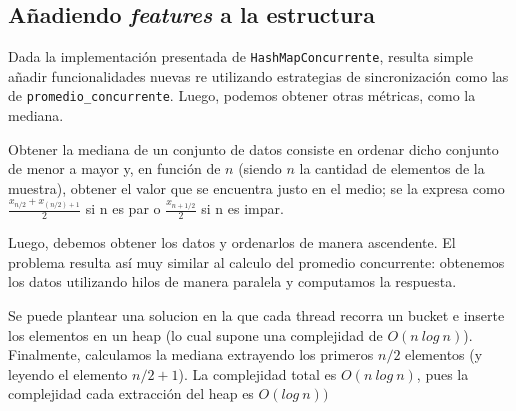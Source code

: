 \documentclass[a4paper]{article}
\begin{document}
    \subsection{Añadiendo \textit{features} a la estructura}

    Dada la implementación presentada de \texttt{HashMapConcurrente}, resulta simple añadir funcionalidades nuevas re utilizando estrategias de sincronización como las de \texttt{promedio\_concurrente}. Luego, podemos obtener otras métricas, como la mediana.

    Obtener la mediana de un conjunto de datos consiste en ordenar dicho conjunto de menor a mayor y, en función de $n$ (siendo $n$ la cantidad de elementos de la muestra), obtener el valor que se encuentra justo en el medio; se la expresa como $\frac{x_{n/2} + x_{(n/2)+1}}{2}$  si n es par  o  $\frac{x_{n+1/2}}{2}$ si n es impar.

    Luego, debemos obtener los datos y ordenarlos de manera ascendente. El problema resulta así muy similar al calculo del promedio concurrente: obtenemos los datos utilizando hilos de manera paralela y computamos la respuesta.

    Se puede plantear una solucion en la que cada thread recorra un bucket e inserte los elementos en un heap (lo cual supone una complejidad de $O(n\ log\ n)$). Finalmente, calculamos la mediana extrayendo los primeros $n/2$ elementos (y leyendo el elemento $n/2 + 1$). La complejidad total es $O(n\ log\ n)$, pues la complejidad cada extracción del heap es $O(log\ n))$
\end{document}
